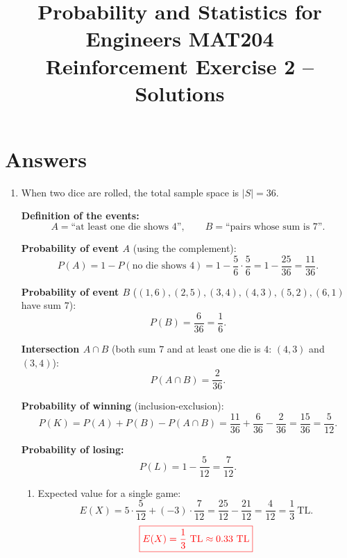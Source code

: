 \documentclass[12pt,a4paper]{article}
\title{\textbf{\color{TitleColor}Probability and Statistics for Engineers MAT204\\[0.3cm]
Reinforcement Exercise 2 -- Solutions}}
\author{}
\date{}
\begin{document}
\maketitle

\section*{\textbf{\color{TitleColor}Answers}}

\begin{enumerate}

\item When two dice are rolled, the total sample space is $|S|=36$.

\textbf{Definition of the events:}
\[
A=\text{``at least one die shows 4''},\qquad B=\text{``pairs whose sum is 7''}.
\]

\textbf{Probability of event $A$} (using the complement):
\[
P(A)=1-P(\text{no die shows 4})=1-\frac{5}{6}\cdot\frac{5}{6}=1-\frac{25}{36}=\frac{11}{36}.
\]

\textbf{Probability of event $B$} ($(1,6),(2,5),(3,4),(4,3),(5,2),(6,1)$ have sum $7$):
\[
P(B)=\frac{6}{36}=\frac{1}{6}.
\]

\textbf{Intersection $A\cap B$} (both sum $7$ and at least one die is $4$: $(4,3)$ and $(3,4)$):
\[
P(A\cap B)=\frac{2}{36}.
\]

\textbf{Probability of winning} (inclusion-exclusion):
\[
P(K)=P(A)+P(B)-P(A\cap B)=\frac{11}{36}+\frac{6}{36}-\frac{2}{36}=\frac{15}{36}=\frac{5}{12}.
\]

\textbf{Probability of losing:}
\[
P(L)=1-\frac{5}{12}=\frac{7}{12}.
\]

\begin{center}
\end{center}

\begin{enumerate}
\item Expected value for a single game:
\[
E(X)=5\cdot\frac{5}{12}+(-3)\cdot\frac{7}{12}=\frac{25}{12}-\frac{21}{12}=\frac{4}{12}=\frac{1}{3}\ \text{TL}.
\]
\[
{\color{red}\boxed{E(X)=\frac{1}{3}\ \text{TL}\approx 0.33\ \text{TL}}}
\]


\end{enumerate}
\end{enumerate}
\end{document}
